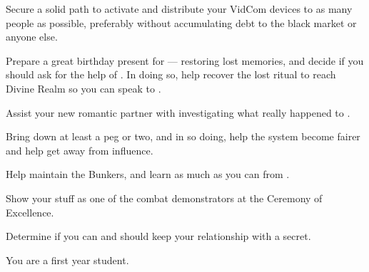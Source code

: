 \documentclass[char]{GL2020}
\begin{document}
{{\begin{itemz}
    \item Secure a solid path to activate and distribute your VidCom devices to as many people as possible, preferably without accumulating debt to the black market or anyone else.
    \item Prepare a great birthday present for \cDisney{} — restoring \cDisney{\their} lost memories, and decide if you should ask for the help of \cWildCard{}. In doing so, help \cDisney{} recover the lost ritual to reach Divine Realm so you can speak to \cTechGod{}.
    \item Assist your new romantic partner \cWarlordDaughter{} with investigating what really happened to \cLoud{}.
    \item Bring down \AntiChup{} at least a peg or two, and in so doing, help the system become fairer and help \cScholarship{} get away from \cAntiChup{\their} influence.  
    \item Help \cBunker{} maintain the Bunkers, and learn as much as you can from \cBunker{\them}.
    \item Show your stuff as one of the combat demonstrators at the Ceremony of Excellence.
    \item Determine if you can and should keep your relationship with \cWarlordDaughter{} a secret.
\end{itemz}

\begin{itemz}[Notes]
    \item You are a first year student.
\end{itemz}

}}
\end{document}
